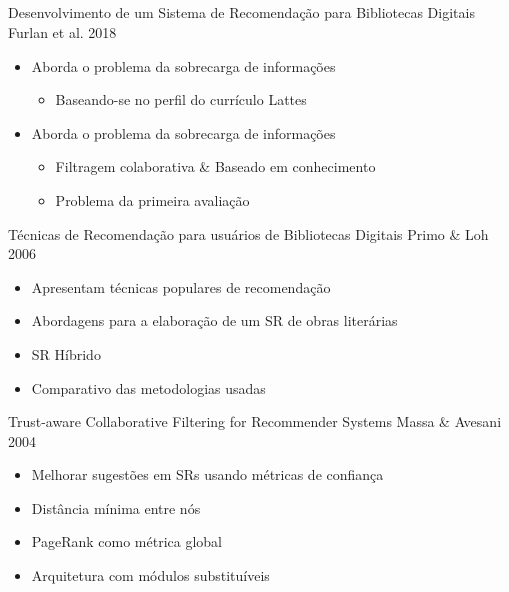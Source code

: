 \documentclass{beamer}
\begin{document}
\subsection[Trabalhos Relacionados]{}

\begin{frame}{Desenvolvimento de um Sistema de Recomendação para Bibliotecas Digitais}
  {Furlan et al. 2018}
  
  \begin{itemize}
    \item Aborda o problema da sobrecarga de informações 
    \begin{itemize}
      \item Baseando-se no perfil do currículo Lattes
    \end{itemize}

    \item Aborda o problema da sobrecarga de informações 
    \begin{itemize}
      \item Filtragem colaborativa \& Baseado em conhecimento
      \item Problema da primeira avaliação
    \end{itemize}
  \end{itemize}
\end{frame}

\begin{frame}{Técnicas de Recomendação para usuários de Bibliotecas Digitais}
  {Primo \& Loh 2006}
  
  \begin{itemize}
    \item Apresentam técnicas populares de recomendação 
    \item Abordagens para a elaboração de um SR de obras literárias
    \item SR Híbrido
    \item Comparativo das metodologias usadas
  \end{itemize}
\end{frame}

\begin{frame}{Trust-aware Collaborative Filtering for Recommender Systems}
  {Massa \& Avesani 2004}
  
  \begin{itemize}
    \item Melhorar sugestões em SRs usando métricas de confiança 
    \item Distância mínima entre nós
    \item PageRank como métrica global
    \item Arquitetura com módulos substituíveis
  \end{itemize}
\end{frame}
\end{document}
